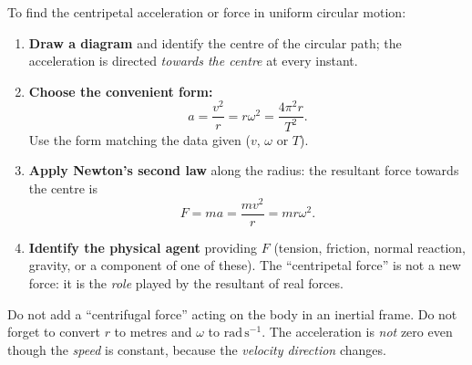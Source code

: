 \documentclass[11pt]{article}
\begin{document}
\begin{methode}[Applying $a = \dfrac{v^2}{r} = r\omega^2$ and $F = ma$]
To find the centripetal acceleration or force in uniform circular motion:
\begin{enumerate}
\item \textbf{Draw a diagram} and identify the centre of the circular path; the acceleration is directed \emph{towards the centre} at every instant.
\item \textbf{Choose the convenient form:}
\[ a = \frac{v^2}{r} = r\omega^2 = \frac{4\pi^2 r}{T^2}. \]
Use the form matching the data given ($v$, $\omega$ or $T$).
\item \textbf{Apply Newton's second law} along the radius: the resultant force towards the centre is
\[ F = ma = \frac{mv^2}{r} = mr\omega^2. \]
\item \textbf{Identify the physical agent} providing $F$ (tension, friction, normal reaction, gravity, or a component of one of these). The ``centripetal force'' is not a new force: it is the \emph{role} played by the resultant of real forces.
\end{enumerate}
\begin{attention}
Do not add a ``centrifugal force'' acting on the body in an inertial frame. Do not forget to convert $r$ to metres and $\omega$ to $\mathrm{rad\,s^{-1}}$. The acceleration is \emph{not} zero even though the \emph{speed} is constant, because the \emph{velocity direction} changes.
\end{attention}
\end{methode}
\end{document}
